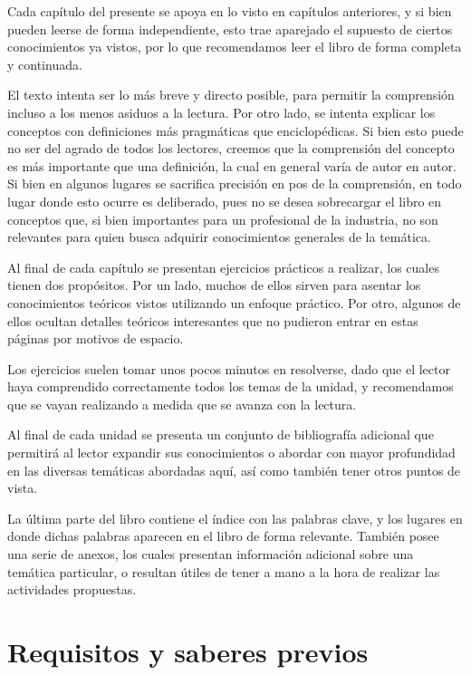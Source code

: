 Cada capítulo del presente se apoya en lo visto en capítulos anteriores, y si
bien pueden leerse de forma independiente, esto trae aparejado el supuesto de
ciertos conocimientos ya vistos, por lo que recomendamos leer el libro de
forma completa y continuada.

El texto intenta ser lo más breve y directo posible, para permitir la comprensión
incluso a los menos asiduos a la lectura. Por otro lado, se intenta explicar los
conceptos con definiciones más pragmáticas que enciclopédicas. Si bien esto puede
no ser del agrado de todos los lectores, creemos que la comprensión del concepto
es más importante que una definición, la cual en general varía de autor en autor.
Si bien en algunos lugares se sacrifica precisión en pos de la comprensión, en
todo lugar donde esto ocurre es deliberado, pues no se desea sobrecargar el libro
en conceptos que, si bien importantes para un profesional de la industria, no
son relevantes para quien busca adquirir conocimientos generales de la temática.

Al final de cada capítulo se presentan ejercicios prácticos a realizar, los
cuales tienen dos propósitos. Por un lado, muchos de ellos sirven para asentar
los conocimientos teóricos vistos utilizando un enfoque práctico. Por otro,
algunos de ellos ocultan detalles teóricos interesantes que no pudieron entrar
en estas páginas por motivos de espacio.

Los ejercicios suelen tomar unos pocos minutos en resolverse, dado que el lector
haya comprendido correctamente todos los temas de la unidad, y recomendamos
que se vayan realizando a medida que se avanza con la lectura. 

Al final de cada unidad se presenta un conjunto de bibliografía adicional que
permitirá al lector expandir sus conocimientos o abordar con mayor profundidad
en las diversas temáticas abordadas aquí, así como también tener otros puntos de
vista.

La última parte del libro contiene el índice con las palabras clave, y los lugares
en donde dichas palabras aparecen en el libro de forma relevante. También
posee una serie de anexos, los cuales presentan información adicional sobre
una temática particular, o resultan útiles de tener a mano a la hora de realizar
las actividades propuestas.

\section*{Requisitos y saberes previos}

